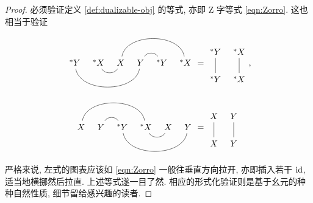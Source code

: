 \begin{proof}
	必须验证定义 \ref{def:dualizable-obj} 的等式, 亦即 Z 字等式 \eqref{eqn:Zorro}. 这也相当于验证
	\begin{align*}
		\begin{tikzcd}[column sep=tiny, ampersand replacement=\&]
			{}^* Y \arrow[dash, rrr, bend right=80] \& {}^* X \arrow[dash, r, bend right=60] \& X \arrow[dash, rrr, bend left=80] \& Y \arrow[dash, r, bend left=60] \& {}^* Y \& {}^* X
		\end{tikzcd} & = \begin{tikzcd}[column sep=tiny, ampersand replacement=\&]
			{}^* Y \arrow[dash, d] \& {}^* X \arrow[dash, d] \\
			{}^* Y \& {}^* X 
		\end{tikzcd}, \\
		\begin{tikzcd}[column sep=tiny, ampersand replacement=\&]
			X \arrow[dash, rrr, bend left=80] \& Y \arrow[dash, r, bend left=60] \& {}^* Y \arrow[dash, rrr, bend right=80] \& {}^* X \arrow[dash, r, bend right=60] \& X \& Y
		\end{tikzcd} & = \begin{tikzcd}[column sep=tiny, ampersand replacement=\&]
			X \arrow[dash, d] \& Y \arrow[dash, d] \\
			X \& Y 
		\end{tikzcd}
	\end{align*}
	严格来说, 左式的图表应该如 \eqref{eqn:Zorro} 一般往垂直方向拉开, 亦即插入若干 $\mathrm{id}$, 适当地横挪然后拉直. 上述等式遂一目了然. 相应的形式化验证则是基于幺元的种种自然性质, 细节留给感兴趣的读者.
\end{proof}


